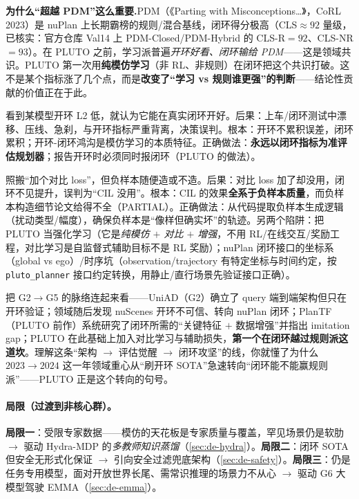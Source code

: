 \begin{note}
\textbf{为什么“超越 PDM”这么重要.}\;PDM（《Parting with Misconceptions\dots》，CoRL 2023\cite{dauner2023pdm}）是 nuPlan 上长期霸榜的规则/混合基线，闭环得分极高（CLS$\approx 92$ 量级，已核实：官方仓库 Val14 上 PDM-Closed/PDM-Hybrid 的 CLS-R$=92$、CLS-NR$=93$）。在 PLUTO 之前，学习派普遍\emph{开环好看、闭环输给 PDM}——这是领域共识。PLUTO 第一次用\textbf{纯模仿学习}（非 RL、非规则）在闭环把这个共识打破。这不是某个指标涨了几个点，而是\textbf{改变了“学习 vs 规则谁更强”的判断}——结论性贡献的价值正在于此。
\end{note}

\begin{pitfall}
看到某模型开环 L2 低，就认为它能在真实闭环开好。后果：上车/闭环测试中漂移、压线、急刹，与开环指标严重背离，决策误判。根本：开环不累积误差，闭环累积；开环-闭环鸿沟是模仿学习的本质特征。正确做法：\textbf{永远以闭环指标为准评估规划器}；报告开环时必须同时报闭环（PLUTO 的做法）。
\end{pitfall}

\begin{pitfall}
照搬“加个对比 loss”，但负样本随便造或不造。后果：对比 loss 加了却没用，闭环不见提升，误判为“CIL 没用”。根本：CIL 的效果\textbf{全系于负样本质量}，而负样本构造细节论文给得不全（PARTIAL）。正确做法：从代码提取负样本生成逻辑（扰动类型/幅度），确保负样本是“像样但确实坏”的轨迹。另两个陷阱：把 PLUTO 当强化学习（它是\emph{纯模仿 $+$ 对比 $+$ 增强}，不用 RL/在线交互/奖励工程，对比学习是自监督式辅助目标不是 RL 奖励）；nuPlan 闭环接口的坐标系（global vs ego）/时序坑（observation/trajectory 有特定坐标与时间约定，按 \texttt{pluto\_planner} 接口约定转换，用静止/直行场景先验证接口正确）。
\end{pitfall}

\begin{insight}
把 G2$\to$G5 的脉络连起来看——UniAD（G2）确立了 query 端到端架构但只在开环验证；领域随后发现 nuScenes 开环不可信、转向 nuPlan 闭环；PlanTF（PLUTO 前作）系统研究了闭环所需的“关键特征 $+$ 数据增强”并指出 imitation gap；PLUTO 在此基础上加入对比学习与辅助损失，\textbf{第一个在闭环越过规则派这道坎}。理解这条“架构 $\to$ 评估觉醒 $\to$ 闭环攻坚”的线，你就懂了为什么 $2023\to2024$ 这一年领域重心从“刷开环 SOTA”急速转向“闭环能不能赢规则派”——PLUTO 正是这个转向的句号。
\end{insight}

\paragraph{局限（过渡到非核心群）。}
\textbf{局限一}：受限专家数据——模仿的天花板是专家质量与覆盖，罕见场景仍是软肋 $\to$ 驱动 Hydra-MDP 的\emph{多教师知识蒸馏}（\cref{sec:de-hydra}）。\textbf{局限二}：闭环 SOTA 但安全无形式化保证 $\to$ 引向安全过滤兜底架构（\cref{sec:de-safety}）。\textbf{局限三}：仍是任务专用模型，面对开放世界长尾、需常识推理的场景力不从心 $\to$ 驱动 G6 大模型驾驶 EMMA（\cref{sec:de-emma}）。

